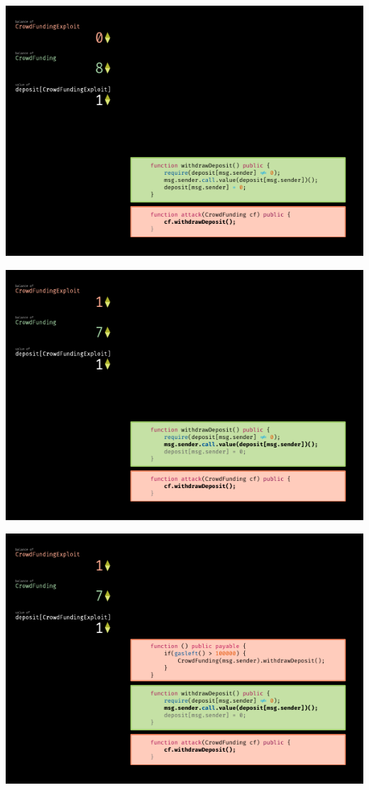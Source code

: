 \documentclass[xcolor=x11names,compress]{beamer}
\begin{document}
\begin{frame}[fragile]
\begin{overprint}
\begin{center}
			\includegraphics[width=\textwidth,height=0.8\textheight,keepaspectratio]{img/reentrancy/03.pdf}
		\end{center}
		\begin{center}
			\includegraphics[width=\textwidth,height=0.8\textheight,keepaspectratio]{img/reentrancy/04.pdf}
		\end{center}
		\begin{center}
			\includegraphics[width=\textwidth,height=0.8\textheight,keepaspectratio]{img/reentrancy/05.pdf}

\end{center}
\end{overprint}
\end{frame}
\end{document}

